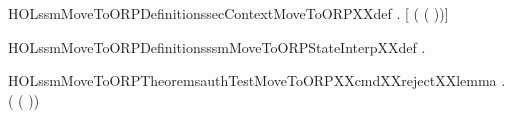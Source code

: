 \newcommand{\HOLssmMoveToORPDate}{10 June 2018}
\newcommand{\HOLssmMoveToORPTime}{23:46}
\begin{SaveVerbatim}{HOLssmMoveToORPDefinitionssecContextMoveToORPXXdef}
\HOLTokenTurnstile{} \HOLSymConst{\HOLTokenForall{}}.
       \HOLSymConst{=}
     [    ( ( ))]
\end{SaveVerbatim}
\newcommand{\HOLssmMoveToORPDefinitionssecContextMoveToORPXXdef}{\UseVerbatim{HOLssmMoveToORPDefinitionssecContextMoveToORPXXdef}}
\begin{SaveVerbatim}{HOLssmMoveToORPDefinitionsssmMoveToORPStateInterpXXdef}
\HOLTokenTurnstile{} \HOLSymConst{\HOLTokenForall{}}.   \HOLSymConst{=} 
\end{SaveVerbatim}
\newcommand{\HOLssmMoveToORPDefinitionsssmMoveToORPStateInterpXXdef}{\UseVerbatim{HOLssmMoveToORPDefinitionsssmMoveToORPStateInterpXXdef}}
\newcommand{\HOLssmMoveToORPDefinitions}{
\HOLDfnTag{ssmMoveToORP}{secContextMoveToORP_def}\HOLssmMoveToORPDefinitionssecContextMoveToORPXXdef
\HOLDfnTag{ssmMoveToORP}{ssmMoveToORPStateInterp_def}\HOLssmMoveToORPDefinitionsssmMoveToORPStateInterpXXdef
}
\begin{SaveVerbatim}{HOLssmMoveToORPTheoremsauthTestMoveToORPXXcmdXXrejectXXlemma}
\HOLTokenTurnstile{} \HOLSymConst{\HOLTokenForall{}}. \HOLSymConst{\HOLTokenNeg{}} ( ( ))
\end{SaveVerbatim}
\newcommand{\HOLssmMoveToORPTheoremsauthTestMoveToORPXXcmdXXrejectXXlemma}{\UseVerbatim{HOLssmMoveToORPTheoremsauthTestMoveToORPXXcmdXXrejectXXlemma}}
